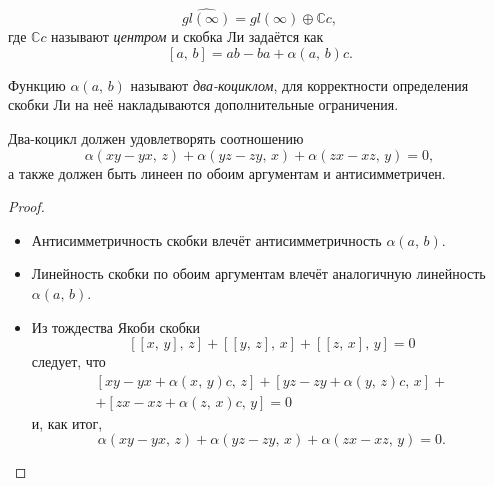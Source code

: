 \documentclass[a4paper,14pt]{extarticle}
\numberwithin{equation}{section}
\begin{document}
\begin{dfn*}
\begin{equation}
	\widehat{gl(\infty)}= gl(\infty)
	\oplus  \mathbb{C}c,
\end{equation} 
где $\mathbb{C}c$ называют \emph{центром} и скобка Ли задаётся как
\begin{equation}
	\left[ a,\,b \right] =ab-ba+ \alpha\left( a,\,b \right) c
.\end{equation} 
\end{dfn*}
Функцию $\alpha(a,\,b)$ называют \emph{два-коциклом}, для
корректности определения скобки Ли на неё накладываются
дополнительные ограничения.
\begin{stm*}
Два-коцикл должен удовлетворять соотношению
\begin{equation}
	\alpha\left( xy-yx,\,z \right) +\alpha\left( yz-zy,\,x \right) +\alpha\left( zx-xz,\,y \right) =0
,\end{equation}
а также должен быть  линеен по обоим аргументам  и антисимметричен.
\end{stm*}
\begin{proof}
\begin{itemize}
	\item Антисимметричность скобки влечёт антисимметричность $\alpha(a,\,b)$.
	\item Линейность скобки по обоим аргументам влечёт аналогичную линейность $\alpha(a,\,b)$.
	\item Из тождества Якоби скобки
\begin{equation}
\left[ \left[ x,\,y \right],\,z \right] +\left[ \left[ y,\,z \right] ,\,x \right] +\left[ \left[ z,\,x \right] ,\,y \right] =0
\end{equation} 
следует, что
\begin{multline}
	\left[ xy -yx+\alpha\left( x,\,y \right) c,\,z \right] +\left[ yz-zy+\alpha\left( y,\,z \right) c,\,x \right] +\\+\left[ zx-xz+\alpha\left( z,\,x \right) c,\,y \right] =0
\end{multline} 
и, как итог,
\begin{equation}
	\alpha\left( xy-yx,\,z \right) +\alpha\left( yz-zy,\,x \right) +\alpha\left( zx-xz,\,y \right) =0
.\end{equation} 
\end{itemize}

\end{proof}%
\end{document}
